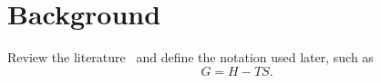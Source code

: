 \chapter{Background}
\label{chap:background}

Review the literature~\citep{lamport1994} and define the notation used later, such as
\begin{equation}
  G = H - TS .
\end{equation}
